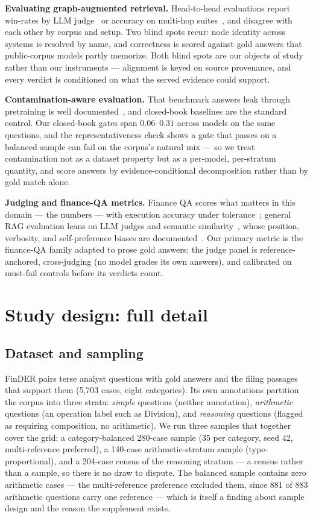 \documentclass{article}
\begin{document}
\textbf{Evaluating graph-augmented retrieval.} Head-to-head evaluations
report win-rates by LLM judge~\citep{graphrag} or accuracy on multi-hop
suites~\citep{ragvsgraphrag}, and disagree with each other by corpus and
setup. Two blind spots recur: node identity across systems is resolved by
name, and correctness is scored against gold answers that public-corpus
models partly memorize. Both blind spots are our objects of study rather
than our instruments --- alignment is keyed on source provenance, and every
verdict is conditioned on what the served evidence could support.

\textbf{Contamination-aware evaluation.} That benchmark answers leak
through pretraining is well documented~\citep{contamination}, and
closed-book baselines are the standard control. Our closed-book gates span
$0.06$--$0.31$ across models on the same questions, and the
representativeness check shows a gate that passes on a balanced sample can
fail on the corpus's natural mix --- so we treat contamination not as a
dataset property but as a per-model, per-stratum quantity, and score
answers by evidence-conditional decomposition rather than by gold match
alone.

\textbf{Judging and finance-QA metrics.} Finance QA scores what matters in
this domain --- the numbers --- with execution accuracy under
tolerance~\citep{finqa,tatqa}; general RAG evaluation leans on LLM judges
and semantic similarity~\citep{geval,prometheus2,ragas}, whose position,
verbosity, and self-preference biases are documented~\citep{judgebench,
llmjudge}. Our primary metric is the finance-QA family adapted to prose
gold answers; the judge panel is reference-anchored, cross-judging (no
model grades its own answers), and calibrated on must-fail controls before
its verdicts count.

\section{Study design: full detail}\label{app:design}

\subsection{Dataset and sampling}

FinDER pairs terse analyst questions with gold answers and the filing
passages that support them (5{,}703 cases, eight categories). Its own
annotations partition the corpus into three strata: \emph{simple} questions
(neither annotation), \emph{arithmetic} questions (an operation label such
as Division), and \emph{reasoning} questions (flagged as requiring
composition, no arithmetic). We run three samples that together cover the
grid: a category-balanced 280-case sample (35 per category, seed 42,
multi-reference preferred), a 140-case arithmetic-stratum sample
(type-proportional), and a 204-case census of the reasoning stratum ---
a census rather than a sample, so there is no draw to dispute. The balanced sample contains zero arithmetic cases --- the
multi-reference preference excluded them, since 881 of 883 arithmetic
questions carry one reference --- which is itself a finding about sample
design and the reason the supplement exists.
\end{document}
